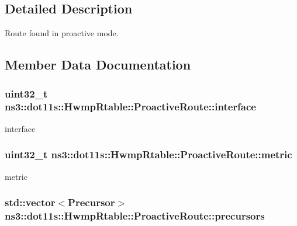 \subsection{Detailed Description}
Route found in proactive mode. 

\subsection{Member Data Documentation}
\subsubsection[{\texorpdfstring{interface}{interface}}]{\setlength{\rightskip}{0pt plus 5cm}uint32\+\_\+t ns3\+::dot11s\+::\+Hwmp\+Rtable\+::\+Proactive\+Route\+::interface}\hypertarget{structns3_1_1dot11s_1_1HwmpRtable_1_1ProactiveRoute_a7eabce1dbb38ac9f1f6c5849f8534d64}{}\label{structns3_1_1dot11s_1_1HwmpRtable_1_1ProactiveRoute_a7eabce1dbb38ac9f1f6c5849f8534d64}


interface 

\subsubsection[{\texorpdfstring{metric}{metric}}]{\setlength{\rightskip}{0pt plus 5cm}uint32\+\_\+t ns3\+::dot11s\+::\+Hwmp\+Rtable\+::\+Proactive\+Route\+::metric}\hypertarget{structns3_1_1dot11s_1_1HwmpRtable_1_1ProactiveRoute_a126114d38ab43a178bce4de9e9906a2c}{}\label{structns3_1_1dot11s_1_1HwmpRtable_1_1ProactiveRoute_a126114d38ab43a178bce4de9e9906a2c}


metric 

\subsubsection[{\texorpdfstring{precursors}{precursors}}]{\setlength{\rightskip}{0pt plus 5cm}std\+::vector$<${\bf Precursor}$>$ ns3\+::dot11s\+::\+Hwmp\+Rtable\+::\+Proactive\+Route\+::precursors}\hypertarget{structns3_1_1dot11s_1_1HwmpRtable_1_1ProactiveRoute_a64eb3beb73dbdf698f92ffe93ce72def}{}\label{structns3_1_1dot11s_1_1HwmpRtable_1_1ProactiveRoute_a64eb3beb73dbdf698f92ffe93ce72def}


